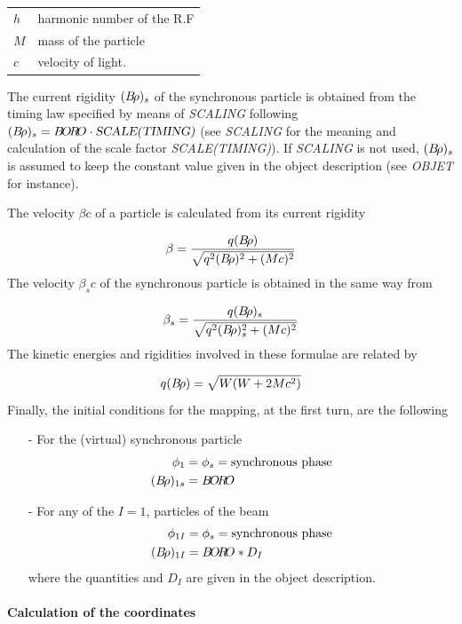  \begin{tabular}{l!{=}l}
   $h$ & harmonic  number  of  the  R.F\\
   $M$ &  mass  of  the  particle \\
   $c$ & velocity  of light.
  \end{tabular}
\bigskip

\noindent The current rigidity $ (B\!\rho )_s $ of the synchronous particle is
obtained from the timing law specified by means of \textsl{SCALING} following 
$ (B\!\rho)_s= B\!O\!R\!O\cdot \text{\textsl{SCALE(TIMING)}} $ 
(see  \textsl{SCALING}  for the meaning and calculation of the scale 
factor \textsl{SCALE(TIMING)}). If \textsl{SCALING} is 
not used, $ (B\!\rho )_s $ is assumed to keep the constant value \BORO
given in the object description (see \textsl{OBJET} for instance). \

\noindent The velocity $ \beta c $ of a particle is calculated from its
current rigidity

$$ \beta  = \frac{q(B\!\rho ) }{ \sqrt{ q^2(B\!\rho )^2+(Mc)^2}} $$
%
 The velocity $ \beta_ sc $ of the synchronous particle is obtained
in the same way from

$$ \beta_ s = \frac{q(B\!\rho )_s }{ \sqrt{ q^2(B\!\rho )^2_s + (Mc)^2}} $$
%
 The kinetic energies and rigidities involved in these formulae are related by

$$ q(B\!\rho ) = \sqrt{ W(W+2Mc^2)} $$
%
 Finally, the initial conditions for the mapping, at the first 
turn, are the following  
\begin{itemize}
\item[-] For the (virtual) synchronous particle
%
\begin{align*}
	\phi_ 1 &  = \phi_ s = \text{synchronous phase}  \\
	(B\!\rho )_{1s} & = B\!O\!R\!O  
\end{align*}

\item[-] For any of the $ I=1$,  \IMAX{}  particles of the beam 
%
\begin{align*}
	\phi_{1I} & = \phi_ s = \text{synchronous  phase} \\
	(B\!\rho )_{1I} & =B\!O\!R\!O \ast  D_I
\end{align*}
%
where the quantities \BORO and $ D_I $ are given in the object description. 
\end{itemize}

\paragraph{Calculation of the coordinates} 

